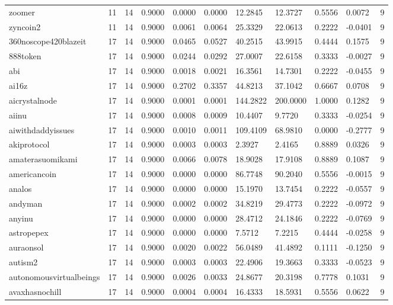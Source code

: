 \begin{table}[htbp]
\begin{tabular}{lllllllllll}
zoomer & 11 & 14 & 0.9000 & 0.0000 & 0.0000 & 12.2845 & 12.3727 & 0.5556 & 0.0072 & 9 \\
zyncoin2 & 11 & 14 & 0.9000 & 0.0061 & 0.0064 & 25.3329 & 22.0613 & 0.2222 & -0.0401 & 9 \\
360noscope420blazeit & 17 & 14 & 0.9000 & 0.0465 & 0.0527 & 40.2515 & 43.9915 & 0.4444 & 0.1575 & 9 \\
888token & 17 & 14 & 0.9000 & 0.0244 & 0.0292 & 27.0007 & 22.6158 & 0.3333 & -0.0027 & 9 \\
abi & 17 & 14 & 0.9000 & 0.0018 & 0.0021 & 16.3561 & 14.7301 & 0.2222 & -0.0455 & 9 \\
ai16z & 17 & 14 & 0.9000 & 0.2702 & 0.3357 & 44.8213 & 37.1042 & 0.6667 & 0.0708 & 9 \\
aicrystalnode & 17 & 14 & 0.9000 & 0.0001 & 0.0001 & 144.2822 & 200.0000 & 1.0000 & 0.1282 & 9 \\
aiinu & 17 & 14 & 0.9000 & 0.0008 & 0.0009 & 10.4407 & 9.7720 & 0.3333 & -0.0254 & 9 \\
aiwithdaddyissues & 17 & 14 & 0.9000 & 0.0010 & 0.0011 & 109.4109 & 68.9810 & 0.0000 & -0.2777 & 9 \\
akiprotocol & 17 & 14 & 0.9000 & 0.0003 & 0.0003 & 2.3927 & 2.4165 & 0.8889 & 0.0326 & 9 \\
amaterasuomikami & 17 & 14 & 0.9000 & 0.0066 & 0.0078 & 18.9028 & 17.9108 & 0.8889 & 0.1087 & 9 \\
americancoin & 17 & 14 & 0.9000 & 0.0000 & 0.0000 & 86.7748 & 90.2040 & 0.5556 & -0.0015 & 9 \\
analos & 17 & 14 & 0.9000 & 0.0000 & 0.0000 & 15.1970 & 13.7454 & 0.2222 & -0.0557 & 9 \\
andyman & 17 & 14 & 0.9000 & 0.0002 & 0.0002 & 34.8219 & 29.4773 & 0.2222 & -0.0972 & 9 \\
anyinu & 17 & 14 & 0.9000 & 0.0000 & 0.0000 & 28.4712 & 24.1846 & 0.2222 & -0.0769 & 9 \\
astropepex & 17 & 14 & 0.9000 & 0.0000 & 0.0000 & 7.5712 & 7.2215 & 0.4444 & -0.0258 & 9 \\
auraonsol & 17 & 14 & 0.9000 & 0.0020 & 0.0022 & 56.0489 & 41.4892 & 0.1111 & -0.1250 & 9 \\
autism2 & 17 & 14 & 0.9000 & 0.0003 & 0.0003 & 22.4906 & 19.3663 & 0.3333 & -0.0523 & 9 \\
autonomousvirtualbeings & 17 & 14 & 0.9000 & 0.0026 & 0.0033 & 24.8677 & 20.3198 & 0.7778 & 0.1031 & 9 \\
avaxhasnochill & 17 & 14 & 0.9000 & 0.0004 & 0.0004 & 16.4333 & 18.5931 & 0.5556 & 0.0622 & 9 \\

\end{tabular}
\end{table}
